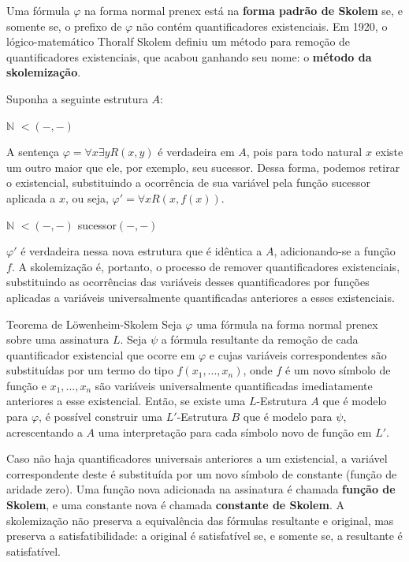 Uma fórmula $\varphi$ na forma normal prenex está na \textbf{forma padrão de Skolem} se, e somente se, o prefixo de $\varphi$ não contém quantificadores existenciais. Em 1920, o lógico-matemático Thoralf Skolem definiu um método para remoção de quantificadores existenciais, que acabou ganhando seu nome: o \textbf{método da skolemização}.

Suponha a seguinte estrutura $A$:
\begin{center}
    \begin{structure}
        {$\mathbb{N}$}
        {}
        {$<$$(-,-)$}
        {}
        {}    
    \end{structure}
\end{center}


A sentença $\varphi = \forall x \exists y R(x,y)$ é verdadeira em $A$, pois para todo natural $x$ existe um outro maior que ele, por exemplo, seu sucessor. Dessa forma, podemos retirar o existencial, substituindo a ocorrência de sua variável pela função sucessor aplicada a $x$, ou seja, $\varphi' = \forall x R(x,f(x))$.
\begin{center}
    \begin{structure}
        {$\mathbb{N}$}
        {}
        {$<$$(-,-)$}
        {}
        {sucessor$(-,-)$}    
    \end{structure}
\end{center}

$\varphi'$ é verdadeira nessa nova estrutura que é idêntica a $A$, adicionando-se a função $f$. A skolemização é, portanto, o processo de remover quantificadores existenciais, substituindo as ocorrências das variáveis desses quantificadores por funções aplicadas a variáveis universalmente quantificadas anteriores a esses existenciais.

\begin{theorem}{Teorema de Löwenheim-Skolem}
    Seja $\varphi$ uma fórmula na forma normal prenex sobre uma assinatura $L$. Seja $\psi$ a fórmula resultante da remoção de cada quantificador existencial que ocorre em $\varphi$ e cujas variáveis correspondentes são substituídas por um termo do tipo $f(x_1,...,x_n)$, onde $f$ é um novo símbolo de função e $x_1,...,x_n$ são variáveis universalmente quantificadas imediatamente anteriores a esse existencial. Então, se existe uma $L$-Estrutura $A$ que é modelo para $\varphi$, é possível construir uma $L'$-Estrutura $B$ que é modelo para $\psi$, acrescentando a $A$ uma interpretação para cada símbolo novo de função em $L'$.
\end{theorem}
Caso não haja quantificadores universais anteriores a um existencial, a variável correspondente deste é substituída por um novo símbolo de constante (função de aridade zero). Uma função nova adicionada na assinatura é chamada \textbf{função de Skolem}, e uma constante nova é chamada \textbf{constante de Skolem}. A skolemização não preserva a equivalência das fórmulas resultante e original, mas preserva a satisfatibilidade: a original é satisfatível se, e somente se, a resultante é satisfatível.

